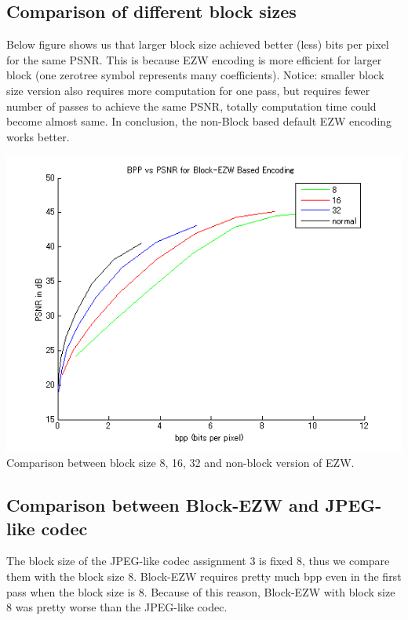 \documentclass[article,oneside]{memoir}
\begin{document}
\newpage

\subsection{Comparison of different block sizes}

Below figure shows us that larger block size achieved better (less) bits per pixel for the same PSNR. 
This is because EZW encoding is more efficient for larger block (one zerotree symbol represents many coefficients). Notice: smaller block size version also requires more computation for one pass, but requires fewer number of passes to achieve the same PSNR, totally computation time could become almost same. 
In conclusion, the non-Block based default EZW encoding works better. 

\begin{center}
\includegraphics[width=14cm]{../src/LenaEZWPlotBlockSizes.png}\\
Comparison between block size 8, 16, 32 and non-block version of EZW. 
\end{center}

\subsection{Comparison between Block-EZW and JPEG-like codec}

The block size of the JPEG-like codec assignment 3 is fixed 8, thus we compare them with the block size 8. 
Block-EZW requires pretty much bpp even in the first pass when the block size is 8. 
Because of this reason, Block-EZW with block size 8 was pretty worse than the JPEG-like codec. 
\end{document}
